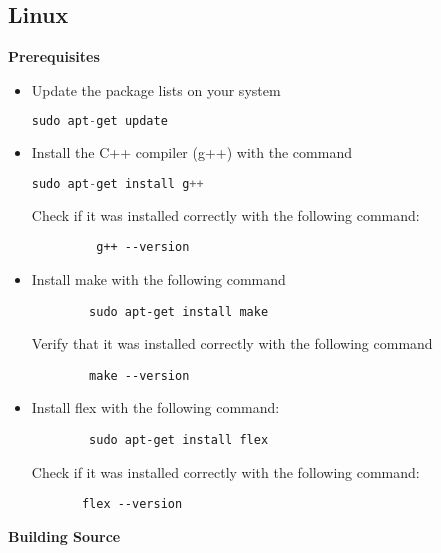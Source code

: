 \documentclass{article}
\begin{document}
\subsection{Linux}
\textbf{Prerequisites}
\begin{itemize}
    \item Update the package lists on your system
    \begin{lstlisting}[language=Python]
    sudo apt-get update
    \end{lstlisting}
    \item Install the C++ compiler (g++) with the command 
    \begin{lstlisting}[language=Python]
    sudo apt-get install g++
    \end{lstlisting}
    
    Check if it was installed correctly with the following command:
    \begin{lstlisting}
         g++ --version

    \end{lstlisting}
    \item Install make with the following command
    \begin{lstlisting}
        sudo apt-get install make
    \end{lstlisting}
    Verify that it was installed correctly with the following command
    \begin{lstlisting}
        make --version
    \end{lstlisting}
    \item Install flex with the following command:
    \begin{lstlisting}
        sudo apt-get install flex
    \end{lstlisting}
    Check if it was installed correctly with the following command:
    \begin{lstlisting}
       flex --version
    \end{lstlisting}
\end{itemize}
\textbf{Building Source}
\end{document}
